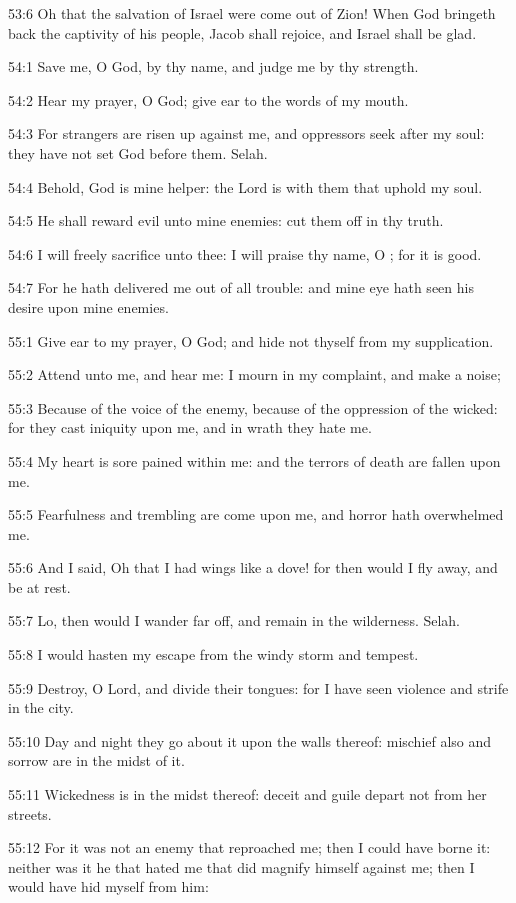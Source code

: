 53:6 Oh that the salvation of Israel were come out of Zion! When God
bringeth back the captivity of his people, Jacob shall rejoice, and
Israel shall be glad.



54:1 Save me, O God, by thy name, and judge me by thy strength.

54:2 Hear my prayer, O God; give ear to the words of my mouth.

54:3 For strangers are risen up against me, and oppressors seek after
my soul: they have not set God before them. Selah.

54:4 Behold, God is mine helper: the Lord is with them that uphold my
soul.

54:5 He shall reward evil unto mine enemies: cut them off in thy
truth.

54:6 I will freely sacrifice unto thee: I will praise thy name, O
\LORD; for it is good.

54:7 For he hath delivered me out of all trouble: and mine eye hath
seen his desire upon mine enemies.



55:1 Give ear to my prayer, O God; and hide not thyself from my
supplication.

55:2 Attend unto me, and hear me: I mourn in my complaint, and make a
noise;

55:3 Because of the voice of the enemy, because of the oppression of
the wicked: for they cast iniquity upon me, and in wrath they hate me.

55:4 My heart is sore pained within me: and the terrors of death are
fallen upon me.

55:5 Fearfulness and trembling are come upon me, and horror hath
overwhelmed me.

55:6 And I said, Oh that I had wings like a dove! for then would I fly
away, and be at rest.

55:7 Lo, then would I wander far off, and remain in the wilderness.
Selah.

55:8 I would hasten my escape from the windy storm and tempest.

55:9 Destroy, O Lord, and divide their tongues: for I have seen
violence and strife in the city.

55:10 Day and night they go about it upon the walls thereof: mischief
also and sorrow are in the midst of it.

55:11 Wickedness is in the midst thereof: deceit and guile depart not
from her streets.

55:12 For it was not an enemy that reproached me; then I could have
borne it: neither was it he that hated me that did magnify himself
against me; then I would have hid myself from him:

